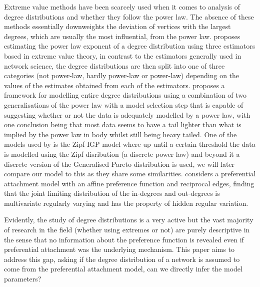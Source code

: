 \documentclass[
  sn-basic,
]{sn-jnl}
\theoremstyle{plain}
\theoremstyle{plain}
\theoremstyle{remark}
\begin{document}
Extreme value methods have been scarcely used when it comes to analysis
of degree distributions and whether they follow the power law. The
absence of these methods essentially downweights the deviation of
vertices with the largest degrees, which are usually the most
influential, from the power law. \citet{Voitalov_2019} proposes
estimating the power law exponent of a degree distribution using three
estimators based in extreme value theory, in contrast to the estimators
generally used in network science, the degree distributions are then
split into one of three categories (not power-law, hardly power-law or
power-law) depending on the values of the estimates obtained from each
of the estimators. \citet{Lee24} proposes a framework for modelling
entire degree distributions using a combination of two generalisations
of the power law with a model selection step that is capable of
suggesting whether or not the data is adequately modelled by a power
law, with one conclusion being that most data seems to have a tail
lighter than what is implied by the power law in body whilst still being
heavy tailed. One of the models used by \citet{Lee24} is the Zipf-IGP
model where up until a certain threshold the data is modelled using the
Zipf disribution (a discrete power law) and beyond it a discrete version
of the Generalised Pareto distribution is used, we will later compare
our model to this as they share some similarities.
\citet{wang2022random} considers a preferential attachment model with an
affine preference function and reciprocal edges, finding that the joint
limiting distribution of the in-degrees and out-degrees is multivariate
regularly varying and has the property of hidden regular variation.

Evidently, the study of degree distributions is a very active but the
vast majority of research in the field (whether using extremes or not)
are purely descriptive in the sense that no information about the
preference function is revealed even if preferential attachment was the
underlying mechanism. This paper aims to address this gap, asking if the
degree distribution of a network is assumed to come from the
preferential attachment model, can we directly infer the model
parameters?
\end{document}
